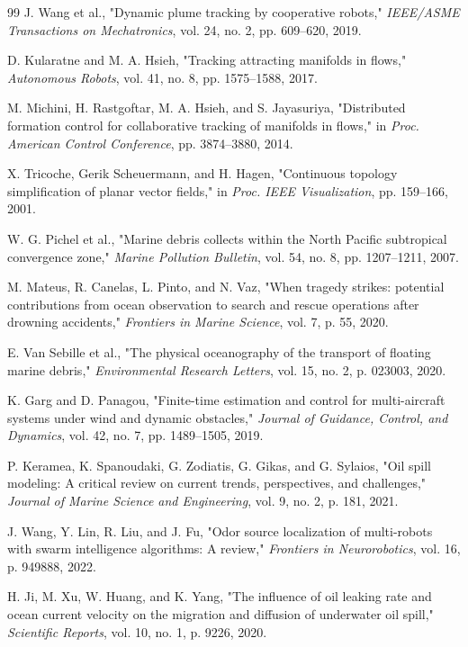 \documentclass[12pt, letterpaper, oneside]{report}
\begin{document}
\begin{thebibliography}{99}
 J. Wang et al., "Dynamic plume tracking by cooperative robots," \textit{IEEE/ASME Transactions on Mechatronics}, vol. 24, no. 2, pp. 609--620, 2019.

 D. Kularatne and M. A. Hsieh, "Tracking attracting manifolds in flows," \textit{Autonomous Robots}, vol. 41, no. 8, pp. 1575--1588, 2017.

 M. Michini, H. Rastgoftar, M. A. Hsieh, and S. Jayasuriya, "Distributed formation control for collaborative tracking of manifolds in flows," in \textit{Proc. American Control Conference}, pp. 3874--3880, 2014.

 X. Tricoche, Gerik Scheuermann, and H. Hagen, "Continuous topology simplification of planar vector fields," in \textit{Proc. IEEE Visualization}, pp. 159--166, 2001.

 W. G. Pichel et al., "Marine debris collects within the North Pacific subtropical convergence zone," \textit{Marine Pollution Bulletin}, vol. 54, no. 8, pp. 1207--1211, 2007.

 M. Mateus, R. Canelas, L. Pinto, and N. Vaz, "When tragedy strikes: potential contributions from ocean observation to search and rescue operations after drowning accidents," \textit{Frontiers in Marine Science}, vol. 7, p. 55, 2020.

 E. Van Sebille et al., "The physical oceanography of the transport of floating marine debris," \textit{Environmental Research Letters}, vol. 15, no. 2, p. 023003, 2020.

 K. Garg and D. Panagou, "Finite-time estimation and control for multi-aircraft systems under wind and dynamic obstacles," \textit{Journal of Guidance, Control, and Dynamics}, vol. 42, no. 7, pp. 1489--1505, 2019.

 P. Keramea, K. Spanoudaki, G. Zodiatis, G. Gikas, and G. Sylaios, "Oil spill modeling: A critical review on current trends, perspectives, and challenges," \textit{Journal of Marine Science and Engineering}, vol. 9, no. 2, p. 181, 2021.

 J. Wang, Y. Lin, R. Liu, and J. Fu, "Odor source localization of multi-robots with swarm intelligence algorithms: A review," \textit{Frontiers in Neurorobotics}, vol. 16, p. 949888, 2022.

 H. Ji, M. Xu, W. Huang, and K. Yang, "The influence of oil leaking rate and ocean current velocity on the migration and diffusion of underwater oil spill," \textit{Scientific Reports}, vol. 10, no. 1, p. 9226, 2020.


\end{thebibliography}
\end{document}
